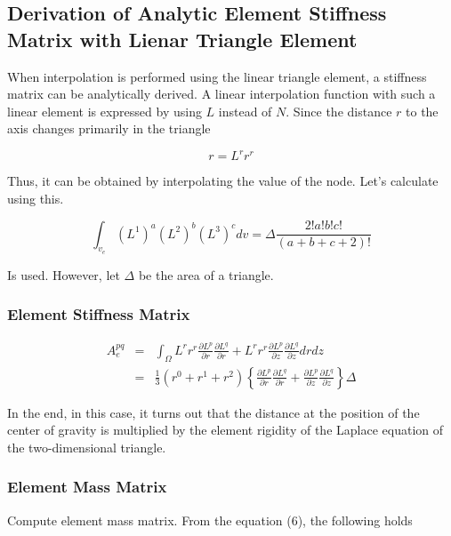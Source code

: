 \subsection{Derivation of Analytic Element Stiffness Matrix with Lienar Triangle Element}
When interpolation is performed using the linear triangle element, a stiffness matrix can be analytically derived. 
%
A linear interpolation function with such a linear element is expressed by using $L$ instead of $N$.
%
Since the distance $r$ to the axis changes primarily in the triangle

\begin{equation}
r = L^r r^r
\end{equation}

Thus, it can be obtained by interpolating the value of the node. Let's calculate using this.

\begin{equation}
\int_{v_e} (L^1)^a(L^2)^b(L^3)^c dv = \Delta\frac{2!a!b!c!}{(a+b+c+2)!}
\end{equation}

Is used. However, let $\Delta$ be the area of ​​a triangle.



\subsubsection{Element Stiffness Matrix}

\begin{eqnarray}
A_e^{pq}
&=& \int_\Omega L^rr^r\frac{\partial L^p}{\partial r}\frac{\partial  L^q}{\partial r} + L^rr^r\frac{\partial L^p}{\partial z}\frac{\partial L^q}{\partial z} drdz\\
&=& \frac{1}{3}(r^0+r^1+r^2)\left\{\frac{\partial L^p}{\partial r}\frac{\partial  L^q}{\partial r} + \frac{\partial L^p}{\partial z}\frac{\partial L^q}{\partial z} \right\}\Delta
\end{eqnarray}

In the end, in this case, it turns out that the distance at the position of the center of gravity is multiplied by the element rigidity of the Laplace equation of the two-dimensional triangle.



\subsubsection{Element Mass Matrix}
Compute element mass matrix. From the equation (6), the following holds

